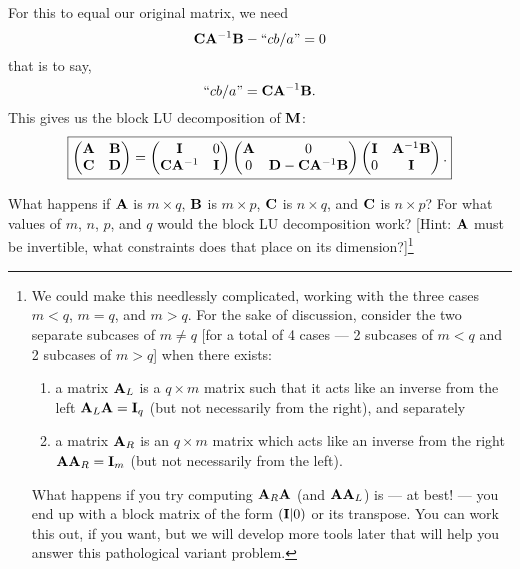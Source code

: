 For this to equal our original matrix, we need
\begin{equation}
\mathbf{C}\mathbf{A}^{-1}\mathbf{B}- \mbox{``$cb/a$''}=0
\end{equation}
that is to say,
\begin{equation}
\mbox{``$cb/a$''} =\mathbf{C}\mathbf{A}^{-1}\mathbf{B}.
\end{equation}
This gives us the block LU decomposition of $\mathbf{M}$:
\begin{equation}
\boxed{
\begin{pmatrix}
  \mathbf{A} & \mathbf{B}\\
  \mathbf{C} & \mathbf{D}
\end{pmatrix}
 = 
\begin{pmatrix}
             \mathbf{I} & 0\\
  \mathbf{C}\mathbf{A}^{-1} & \mathbf{I}
\end{pmatrix}
\begin{pmatrix}
  \mathbf{A} & 0\\
        0 & \mathbf{D} - \mathbf{C}\mathbf{A}^{-1}\mathbf{B}
\end{pmatrix}
\begin{pmatrix}
  \mathbf{I} & \mathbf{A}^{-1}\mathbf{B}\\
        0 & \mathbf{I}
\end{pmatrix}.}
\end{equation}

\begin{problem}
What happens if $\mathbf{A}$ is $m\times q$, $\mathbf{B}$ is $m\times p$,
$\mathbf{C}$ is $n\times q$, and $\mathbf{C}$ is $n\times p$? For what values
of $m$, $n$, $p$, and $q$ would the block LU decomposition
work? [Hint: $\mathbf{A}$ must be invertible, what constraints does that
  place on its dimension?]\footnote{We could make this needlessly
complicated, working with the three cases $m<q$, $m=q$, and $m>q$.
For the sake of discussion, consider the two separate subcases of $m\neq q$
[for a total of 4 cases --- 2 subcases of $m<q$ and 2 subcases of $m>q$]
when there exists:
\begin{enumerate}
\item a matrix $\mathbf{A}_{L}$ is a $q\times m$
matrix such that it acts like an inverse from the left
$\mathbf{A}_{L}\mathbf{A}=\mathbf{I}_{q}$ (but not necessarily from the right),
and separately
\item a matrix $\mathbf{A}_{R}$ is an $q\times m$ matrix which acts like an inverse
from the right $\mathbf{A}\mathbf{A}_{R}=\mathbf{I}_{m}$ (but not necessarily
from the left).
\end{enumerate}
What happens if you try computing $\mathbf{A}_{R}\mathbf{A}$ (and
$\mathbf{A}\mathbf{A}_{L}$) is --- at best! --- you end up with a block matrix
of the form $(\mathbf{I}|0)$ or its transpose.
You can work this out, if you want, but we will develop more tools later
that will help you answer this pathological variant problem.}
\end{problem}

